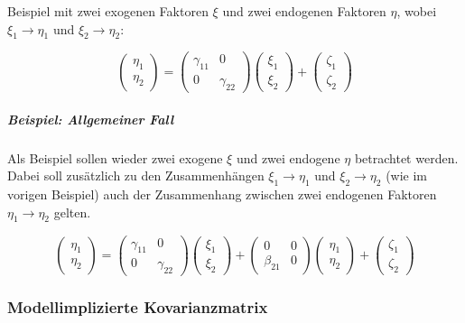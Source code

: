 \documentclass{article}
\numberwithin{equation}{section}
\begin{document}
Beispiel mit zwei exogenen Faktoren $\xi$ und zwei endogenen Faktoren $\eta$, wobei $\xi_1 \to \eta_1$ und $\xi_2 \to \eta_2$:

\begin{equation}
\begin{pmatrix}\eta_1\\ \eta_2\end{pmatrix} =
\begin{pmatrix}\gamma_{11} & 0\\ 0 & \gamma_{22}\end{pmatrix}
\begin{pmatrix}\xi_1\\ \xi_2\end{pmatrix} +
\begin{pmatrix}\zeta_1\\ \zeta_2\end{pmatrix}
\end{equation}

\subparagraph{Beispiel: Allgemeiner Fall}

Als Beispiel sollen wieder zwei exogene $\xi$ und zwei endogene $\eta$ betrachtet werden. Dabei soll zusätzlich zu den Zusammenhängen $\xi_1 \to \eta_1$ und $\xi_2 \to \eta_2$ (wie im vorigen Beispiel) auch der Zusammenhang zwischen zwei endogenen Faktoren $\eta_1 \to \eta_2$ gelten.

\begin{equation}
\begin{pmatrix}\eta_1\\ \eta_2\end{pmatrix} =
\begin{pmatrix}\gamma_{11} & 0\\ 0 & \gamma_{22}\end{pmatrix}
\begin{pmatrix}\xi_1\\ \xi_2\end{pmatrix} +
\begin{pmatrix}0 & 0\\ \beta_{21} & 0\end{pmatrix}
\begin{pmatrix}\eta_1\\ \eta_2\end{pmatrix} +
\begin{pmatrix}\zeta_1\\ \zeta_2\end{pmatrix}
\end{equation}

\subsubsection{Modellimplizierte Kovarianzmatrix}
\end{document}
